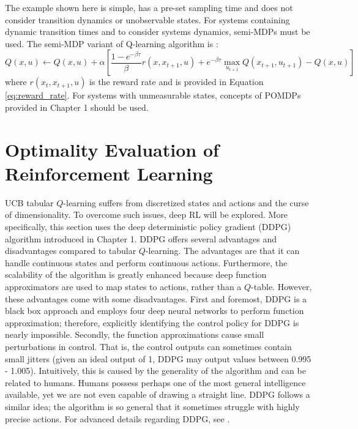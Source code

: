 The example shown here is simple, has a pre-set sampling time and does not consider transition dynamics or unobservable states. For systems containing dynamic transition times and to consider systems dynamics, semi-MDPs must be used.  The semi-MDP variant of Q-learning algorithm is \cite{continuous_rl_ref14}:
\begin{equation}
    Q(x, u) \leftarrow Q(x, u) + \alpha \left[\frac{1 - e^{-\beta \tau}}{\beta}r(x, x_{t+1}, u) + e^{-\beta \tau} \max_{u_{t+1}}Q(x_{t+1}, u_{t+1}) - Q(x, u) \right]
\end{equation}
where $r(x_t, x_{t+1}, u)$ is the reward rate and is provided in Equation \ref{eq:reward_rate}. For systems with unmeasurable states, concepts of POMDPs provided in Chapter 1 should be used.






















\section{Optimality Evaluation of Reinforcement Learning}
UCB tabular $Q$-learning suffers from discretized states and actions and the curse of dimensionality.  To overcome such issues, deep RL will be explored.  More specifically, this section uses the deep deterministic policy gradient (DDPG) algorithm introduced in Chapter 1. DDPG offers several advantages and disadvantages compared to tabular $Q$-learning.  The advantages are that it can handle continuous states and perform continuous actions. Furthermore, the scalability of the algorithm is greatly enhanced because deep function approximators are used to map states to actions, rather than a $Q$-table. However, these advantages come with some disadvantages.  First and foremost, DDPG is a black box approach and employs four deep neural networks to perform function approximation; therefore, explicitly identifying the control policy for DDPG is nearly impossible. Secondly, the function approximations cause small perturbations in control.  That is, the control outputs can sometimes contain small jitters (given an ideal output of 1, DDPG may output values between 0.995 - 1.005).  Intuitively, this is caused by the generality of the algorithm and can be related to humans.  Humans possess perhaps one of the most general intelligence available, yet we are not even capable of drawing a straight line. DDPG follows a similar idea; the algorithm is so general that it sometimes struggle with highly precise actions. For advanced details regarding DDPG, see \cite{ddpg}.  

